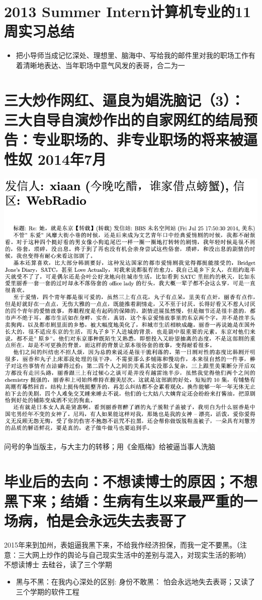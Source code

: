 \documentclass[9pt, b5paper]{article}
\begin{document}
\section{2013 Summer Intern计算机专业的11周实习总结}
\label{sec:org268c6da}
\begin{itemize}
\item 把小导师当成记忆深处、理想里、脑海中、写给我的邮件里对我的职场工作有着清晰地表达、当年职场中意气风发的表哥，合二为一
\end{itemize}

\section{三大炒作网红、逼良为娼洗脑记（3）：三大自导自演炒作出的自家网红的结局预告：专业职场的、非专业职场的将来被逼性奴 2014年7月}
\label{sec:orgbd60b7c}

  \begin{center}
\includegraphics[width=.9\linewidth]{./pic/p2p201.png}
\end{center}
问号的争当版主，与大主力的转移；用《金瓶梅》给被逼当事人洗脑

\section{毕业后的去向：不想读博士的原因；不想黑下来；结婚：生病有生以来最严重的一场病，怕是会永远失去表哥了}
\label{sec:org71f3bc1}
  2015年来到加州，表姐逼我黑下来，不给我作经济担保，而我一定不要黑。（注意：三大网上炒作的舆论与自己现实生活中的差别与混入，对现实生活的影响）
不想读博士
去硅谷，读了三个学期
\begin{itemize}
\item 黑与不黑：在我内心深处的区别: 身份不敢黑： 怕会永远地失去表哥；又读了三个学期的软件工程
\end{itemize}
\end{document}
